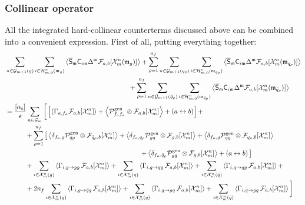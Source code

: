 \subsubsection{Collinear operator}

All the integrated hard-collinear counterterms discussed above can be combined into a convenient expression. First of all, putting everything together:
\begin{equation*}
  \begin{split}
    & \sum_{n \in \mathcal{G}_{m+1}(g)} \sum_{i \in \mathcal{H}^{n}_{m,0}(\mathfrak{m}_g)} \left\langle \overline{\mathsf{S}}_{\mathfrak{m}} \mathsf{C}_{i\mathfrak{m}} \Delta^{\mathfrak{m}} \mathcal{F}_{a,b}[\mathcal{X}^{n}_{m}(\mathfrak{m}_g)] \right\rangle + \sum_{\rho = 1}^{n_f} \sum_{n \in \mathcal{G}_{m+1}(q_\rho)} \sum_{i \in \mathcal{H}^{n}_{m,0}(\mathfrak{m}_{q_\rho})} \left\langle \overline{\mathsf{S}}_{\mathfrak{m}} \mathsf{C}_{i\mathfrak{m}} \Delta^{\mathfrak{m}} \mathcal{F}_{a,b}[\mathcal{X}^{n}_{m}(\mathfrak{m}_{q_\rho})] \right\rangle \\
    & \qquad \qquad \qquad \qquad \qquad \qquad \qquad \qquad \qquad \,\, + \sum_{\rho = 1}^{n_f} \sum_{n \in \mathcal{G}_{m+1}(\bar{q}_\rho)} \sum_{i \in \mathcal{H}^{n}_{m,0}(\mathfrak{m}_{\bar{q}_\rho})} \left\langle \overline{\mathsf{S}}_{\mathfrak{m}} \mathsf{C}_{i\mathfrak{m}} \Delta^{\mathfrak{m}} \mathcal{F}_{a,b}[\mathcal{X}^{n}_{m}(\mathfrak{m}_{\bar{q}_\rho})] \right\rangle \\
    & = \frac{[\alpha_\text{s}]}{\epsilon} \sum_{n \in \mathcal{G}_m} \bigg[ \left[ \left\langle \Gamma_{a,f_a} \mathcal{F}_{a,b}[\mathcal{X}^{n}_{m}] \right\rangle + \left\langle \mathcal{P}^\text{gen}_{f_a f_a} \otimes \mathcal{F}_{a,b}[\mathcal{X}^{n}_{m}] \right\rangle + \left( a \leftrightarrow b \right) \right] + \\
    & \qquad \quad + \sum_{\rho = 1}^{n_f} \big[ \left\langle \delta_{f_a , g} \mathcal{P}^\text{gen}_{\bar{q} g} \otimes \mathcal{F}_{\bar{q}_\rho , b}[\mathcal{X}^{n}_{m}] \right\rangle + \left\langle \delta_{f_a , q_\rho} \mathcal{P}^\text{gen}_{gq} \otimes \mathcal{F}_{g,b}[\mathcal{X}^{n}_{m}] \right\rangle + \left\langle \delta_{f_a , g} \mathcal{P}^\text{gen}_{q g} \otimes \mathcal{F}_{q_\rho , b}[\mathcal{X}^{n}_{m}] \right\rangle \\
    & \qquad \qquad \qquad \qquad \qquad \qquad \qquad \qquad \qquad \qquad + \left\langle \delta_{f_a , \bar{q}_\rho} \mathcal{P}^\text{gen}_{g \bar{q}} \otimes \mathcal{F}_{g,b}[\mathcal{X}^{n}_{m}] \right\rangle + \left( a \leftrightarrow b\right) \big] \\
    & \qquad \quad + \sum_{i \in \mathcal{X}^{n}_{m}(g)} \left\langle \Gamma_{i, g \rightarrow g g} \,\mathcal{F}_{a,b}[\mathcal{X}^{n}_{m}] \right\rangle + \sum_{i \in \mathcal{X}^{n}_{m}(q)} \left\langle \Gamma_{i, q \rightarrow q g} \,\mathcal{F}_{a,b}[\mathcal{X}^{n}_{m}] \right\rangle + \sum_{i \in \mathcal{X}^{n}_{m}(\bar{q})} \left\langle \Gamma_{i, q \rightarrow q g} \,\mathcal{F}_{a,b}[\mathcal{X}^{n}_{m}] \right\rangle + \\
    & \qquad \quad + 2n_f \sum_{i \in \mathcal{X}^{n}_{m}(g)} \left\langle \Gamma_{i , g \rightarrow \bar{q} q} \,\mathcal{F}_{a,b}[\mathcal{X}^{n}_{m}] \right\rangle + \sum_{i \in \mathcal{X}^{n}_{m}(q)} \left\langle \Gamma_{i , q \rightarrow g q} \,\mathcal{F}_{a,b}[\mathcal{X}^{n}_{m}] \right\rangle + \sum_{i \in \mathcal{X}^{n}_{m}(\bar{q})} \left\langle \Gamma_{i , q \rightarrow g q} \,\mathcal{F}_{a,b}[\mathcal{X}^{n}_{m}] \right\rangle \bigg]
  \end{split}
\end{equation*}
